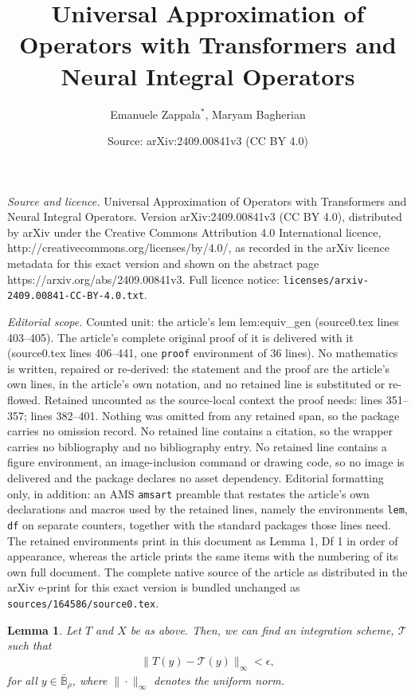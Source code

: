 \documentclass[10pt,a4paper]{amsart}
\title{Universal Approximation of Operators with Transformers and Neural Integral Operators}
\author{Emanuele Zappala$^*$, Maryam Bagherian}
\date{Source: arXiv:2409.00841v3 (CC BY 4.0)}
\newtheorem{lem}{Lemma}
\begin{document}
\maketitle

\noindent\emph{Source and licence.} Universal Approximation of Operators with Transformers and Neural Integral Operators. Version arXiv:2409.00841v3 (CC BY 4.0), distributed by arXiv under the Creative Commons Attribution 4.0 International licence, http://creativecommons.org/licenses/by/4.0/, as recorded in the arXiv licence metadata for this exact version and shown on the abstract page https://arxiv.org/abs/2409.00841v3. Full licence notice: \texttt{licenses/arxiv-2409.00841-CC-BY-4.0.txt}.\par\smallskip

\noindent\textit{Editorial scope.} Counted unit: the article's lem lem:equiv\_gen (source0.tex lines 403--405). The article's complete original proof of it is delivered with it (source0.tex lines 406--441, one \texttt{proof} environment of 36 lines). No mathematics is written, repaired or re-derived: the statement and the proof are the article's own lines, in the article's own notation, and no retained line is substituted or re-flowed.  Retained uncounted as the source-local context the proof needs: lines 351--357; lines 382--401.  Nothing was omitted from any retained span, so the package carries no omission record.  No retained line contains a citation, so the wrapper carries no bibliography and no bibliography entry.  No retained line contains a figure environment, an image-inclusion command or drawing code, so no image is delivered and the package declares no asset dependency.  Editorial formatting only, in addition: an AMS \texttt{amsart} preamble that restates the article's own declarations and macros used by the retained lines, namely the environments \texttt{lem}, \texttt{df} on separate counters, together with the standard packages those lines need.  The retained environments print in this document as Lemma 1, Df 1 in order of appearance, whereas the article prints the same items with the numbering of its own full document.  The complete native source of the article as distributed in the arXiv e-print for this exact version is bundled unchanged as \texttt{sources/164586/source0.tex}.
\begin{lem}\label{lem:int_scheme}
        Let $T$ and $X$ be as above. Then, we can find an integration scheme, $\mathcal T$ such that 
        \begin{eqnarray}
            \|T(y) - \mathcal T(y)\|_{\infty} < \epsilon,
        \end{eqnarray}    
        for all $y\in \bar {\mathbb B}_\rho$, where $\|\cdot \|_{\infty}$ denotes the uniform norm. 
\end{lem}
\end{document}

